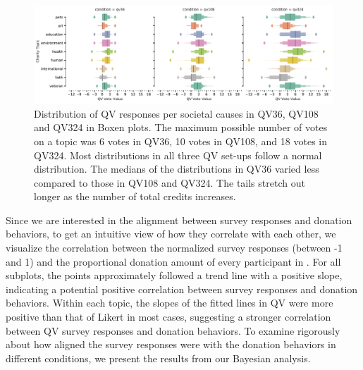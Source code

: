 \begin{figure}[htpb]
    \centering
    \includegraphics[width=\textwidth, keepaspectratio=true]{content/image/qv_distribution_per_topic.pdf}
    \caption{
      Distribution of QV responses per societal causes in QV36, QV108 and QV324 in Boxen plots. The maximum possible number of votes on a topic was 6 votes in QV36, 10 votes in QV108, and 18 votes in QV324. Most distributions in all three QV set-ups follow a normal distribution. The medians of the distributions in QV36 varied less compared to those in QV108 and QV324. The tails stretch out longer as the number of total credits increases. 
    }
    \label{fig:qv3_exp1}
\end{figure}

Since we are interested in the alignment between survey responses and donation behaviors, to get an intuitive view of how they correlate with each other, we visualize the correlation between the normalized survey responses (between -1 and 1) and the proportional donation amount of every participant in . For all subplots, the points approximately followed a trend line with a positive slope, indicating a potential positive correlation between survey responses and donation behaviors. Within each topic, the slopes of the fitted lines in QV were more positive than that of Likert in most cases, suggesting a stronger correlation between QV survey responses and donation behaviors. To examine rigorously about how aligned the survey responses were with the donation behaviors in different conditions, we present the results from our Bayesian analysis.

